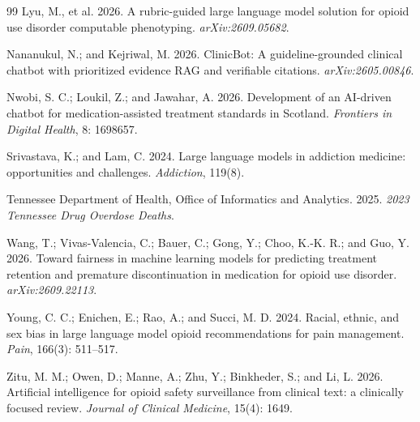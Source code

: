 \documentclass[letterpaper]{article}
\begin{document}
\begin{thebibliography}{99}
 Lyu, M., et al. 2026. A rubric-guided large language model solution for opioid use disorder computable phenotyping. \emph{arXiv:2609.05682}.

 Nananukul, N.; and Kejriwal, M. 2026. ClinicBot: A guideline-grounded clinical chatbot with prioritized evidence RAG and verifiable citations. \emph{arXiv:2605.00846}.

 Nwobi, S. C.; Loukil, Z.; and Jawahar, A. 2026. Development of an AI-driven chatbot for medication-assisted treatment standards in Scotland. \emph{Frontiers in Digital Health}, 8: 1698657.

 Srivastava, K.; and Lam, C. 2024. Large language models in addiction medicine: opportunities and challenges. \emph{Addiction}, 119(8).

 Tennessee Department of Health, Office of Informatics and Analytics. 2025. \emph{2023 Tennessee Drug Overdose Deaths}.

 Wang, T.; Vivas-Valencia, C.; Bauer, C.; Gong, Y.; Choo, K.-K. R.; and Guo, Y. 2026. Toward fairness in machine learning models for predicting treatment retention and premature discontinuation in medication for opioid use disorder. \emph{arXiv:2609.22113}.

 Young, C. C.; Enichen, E.; Rao, A.; and Succi, M. D. 2024. Racial, ethnic, and sex bias in large language model opioid recommendations for pain management. \emph{Pain}, 166(3): 511--517.

 Zitu, M. M.; Owen, D.; Manne, A.; Zhu, Y.; Binkheder, S.; and Li, L. 2026. Artificial intelligence for opioid safety surveillance from clinical text: a clinically focused review. \emph{Journal of Clinical Medicine}, 15(4): 1649.

\end{thebibliography}
\end{document}
